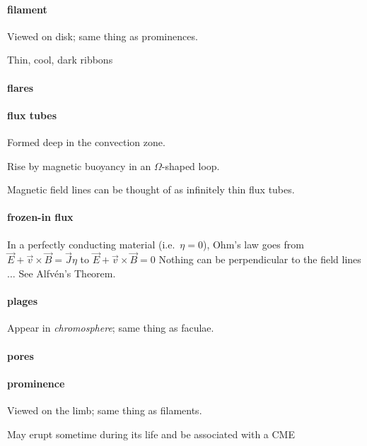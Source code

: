 \documentclass[12pt]{article}
\begin{document}
\paragraph{filament}
    \begin{itemize*}
        \item Viewed on disk; same thing as prominences.
        \item Thin, cool, dark ribbons
    \end{itemize*}

\paragraph{flares}

\paragraph{flux tubes}
    \begin{itemize*}
        \item Formed deep in the convection zone.
        \item Rise by magnetic buoyancy in an $\Omega$-shaped loop.
        \item Magnetic field lines can be thought of as infinitely
          thin flux tubes.
    \end{itemize*}

\paragraph{frozen-in flux}
In a perfectly conducting material (i.e.\ $\eta = 0$),
Ohm's law goes from
$ \vec{E} + \vec{v} \times \vec{B} = \vec{J}\eta $ to
$ \vec{E} + \vec{v} \times \vec{B} = 0 $
Nothing can be perpendicular to the field lines $\ldots$
See Alfv\'en's Theorem.

\paragraph{plages}
    \begin{itemize*}
        \item Appear in \emph{chromosphere}; same thing as faculae.
    \end{itemize*}

\paragraph{pores}

\paragraph{prominence}
    \begin{itemize*}
        \item Viewed on the limb; same thing as filaments.
        \item May erupt sometime during its life and be associated
        with a CME
    \end{itemize*}
\end{document}
